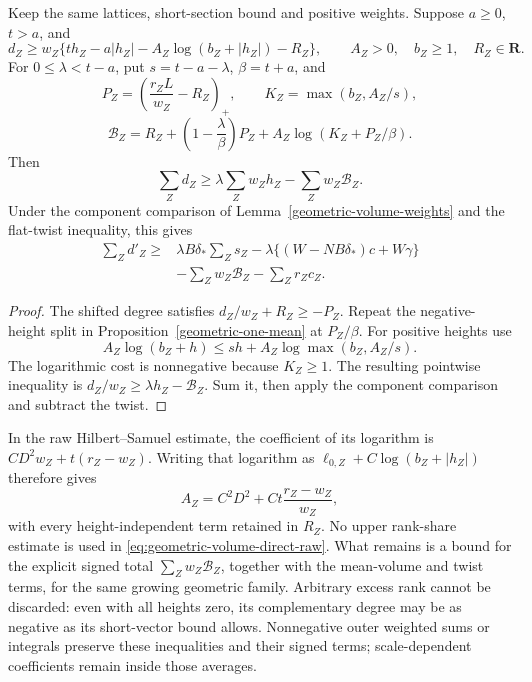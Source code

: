 \begin{proposition}
\label{geometric-signed-raw-degree}
Keep the same lattices, short-section bound and positive weights.
Suppose $a\ge0$, $t>a$, and
\[
 d_Z\ge w_Z\{t h_Z-a|h_Z|
                 -A_Z\log(b_Z+|h_Z|)-R_Z\},
 \qquad A_Z>0,\quad b_Z\ge1,\quad R_Z\in\mathbf R.
\]
For $0\le\lambda<t-a$, put $s=t-a-\lambda$, $\beta=t+a$, and
\[
 P_Z=\left(\frac{r_ZL}{w_Z}-R_Z\right)_+,\qquad
 K_Z=\max(b_Z,A_Z/s),
\]
\[
 \mathcal B_Z=R_Z+\left(1-\frac{\lambda}{\beta}\right)P_Z
               +A_Z\log(K_Z+P_Z/\beta).
\]
Then
\begin{equation}\label{eq:geometric-signed-raw-degree}
 \sum_Zd_Z\ge\lambda\sum_Zw_Zh_Z-\sum_Zw_Z\mathcal B_Z.
\end{equation}
Under the component comparison of
Lemma~\ref{geometric-volume-weights} and the flat-twist inequality,
this gives
\begin{equation}\label{eq:geometric-volume-direct-raw}
 \begin{split}
 \sum_Zd'_Z\ge{}&
 \lambda B\delta_*\sum_Zs_Z
 -\lambda\{(W-NB\delta_*)c+W\gamma\}\\
 &-\sum_Zw_Z\mathcal B_Z-\sum_Zr_Zc_Z .
 \end{split}
\end{equation}
\end{proposition}
\begin{proof}
The shifted degree satisfies $d_Z/w_Z+R_Z\ge-P_Z$.
Repeat the negative-height split in
Proposition~\ref{geometric-one-mean} at $P_Z/\beta$.
For positive heights use
\[
 A_Z\log(b_Z+h)\le sh+A_Z\log\max(b_Z,A_Z/s).
\]
The logarithmic cost is nonnegative because $K_Z\ge1$.
The resulting pointwise inequality is
$d_Z/w_Z\ge\lambda h_Z-\mathcal B_Z$.
Sum it, then apply the component comparison and subtract the twist.
\end{proof}

In the raw Hilbert--Samuel estimate, the coefficient of its logarithm
is $CD^2w_Z+t(r_Z-w_Z)$. Writing that logarithm as
$\ell_{0,Z}+C\log(b_Z+|h_Z|)$ therefore gives
\[
 A_Z=C^2D^2+Ct\frac{r_Z-w_Z}{w_Z},
\]
with every height-independent term retained in $R_Z$.
No upper rank-share estimate is used in
\eqref{eq:geometric-volume-direct-raw}. What remains is a bound for
the explicit signed total $\sum_Zw_Z\mathcal B_Z$, together with
the mean-volume and twist terms, for the same growing geometric family.
Arbitrary excess rank cannot be discarded: even with all heights zero,
its complementary degree may be as negative as its short-vector bound
allows. Nonnegative outer weighted sums or integrals preserve these
inequalities and their signed terms; scale-dependent coefficients
remain inside those averages.


